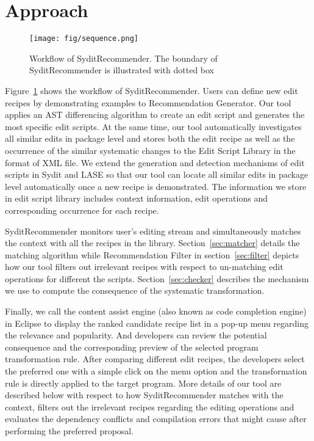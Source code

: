 \section{Approach}\label{sec:approach}

\begin{figure}[ht]
\centering
\texttt{[image: fig/sequence.png]}
\caption{Workflow of SyditRecommender. The boundary of SyditRecommender is illustrated with dotted box}
\label{fig:sequence}
\end{figure}


Figure~\ref{fig:sequence} shows the workflow of SyditRecommender. Users can define new edit recipes by demonstrating examples to Recommendation Generator. Our tool applies an AST differencing algorithm to create an edit script and generates the most specific edit scripts. At the same time, our tool automatically investigates all similar edits in package level and stores both the edit recipe as well as the occurrence of the similar systematic changes to the Edit Script Library in the format of XML file. We extend the generation and detection mechanisms of edit scripts in Sydit \cite{meng:sydit} and LASE \cite{meng:lase} so that our tool can locate all similar edits in package level automatically once a new recipe is demonstrated.  The information we store in edit script library includes context information, edit operations and corresponding occurrence for each recipe. 

SyditRecommender monitors user's editing stream and simultaneously matches the context with all the recipes in the library. Section~\ref{sec:matcher} details the matching algorithm while Recommendation Filter in section~\ref{sec:filter} depicts how our tool filters out irrelevant recipes with respect to un-matching edit operations for different the scripts. Section~\ref{sec:checker} describes the mechanism we use to compute the consequence of the systematic transformation. 

Finally, we call the content assist engine (also known as code completion engine) in Eclipse to display the ranked candidate recipe list in a pop-up menu regarding the relevance and popularity. And developers can review the potential consequence and the corresponding preview of the selected program transformation rule. After comparing different edit recipes, the developers select the preferred one with a simple click on the menu option and the transformation rule is directly applied to the target program. 
More details of our tool are described below with respect to how SyditRecommender matches with the context, filters out the irrelevant recipes regarding the editing operations and evaluates the dependency conflicts and compilation errors that might cause after performing the preferred proposal.


